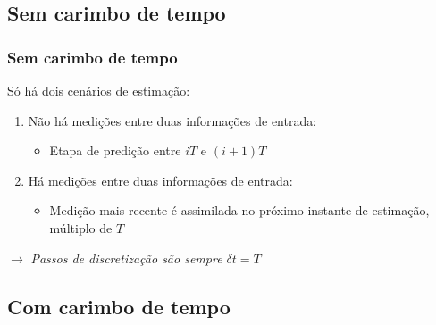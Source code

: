 \documentclass{beamer}
\renewcommand{\(}{\left(}
\renewcommand{\)}{\right)}
\renewcommand{\[}{\left[}
\renewcommand{\]}{\right]}
\begin{document}

\subsection{Sem carimbo de tempo} 

\begin{frame}
	\frametitle{Sem carimbo de tempo}
	
	Só há dois cenários de estimação:
	\vspace{0.25cm}
	
	\begin{enumerate}
		\item Não há medições entre duas informações de entrada:
		\begin{itemize}
			\item Etapa de predição entre $iT$ e $(i+1)T$
		\end{itemize}
		\vspace{0.25cm}
		\item Há medições entre duas informações de entrada:
		\begin{itemize}
			\item Medição mais recente é assimilada no próximo instante de estimação, múltiplo de $T$
		\end{itemize}
	\end{enumerate}
	
	\vspace{0.2cm}
	$\rightarrow$ \textit{Passos de discretização são sempre $\delta t = T$}

\end{frame} 



\subsection{Com carimbo de tempo} 

\end{document}
